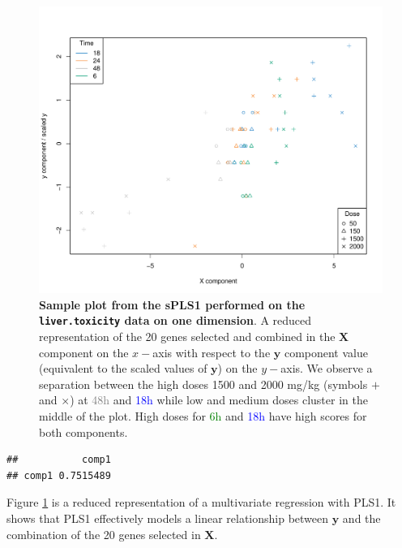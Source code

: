 \documentclass[
]{book}
\newenvironment{Shaded}{\begin{snugshade}}{\end{snugshade}}
\newcommand{\FunctionTok}[1]{\textcolor[rgb]{0.00,0.00,0.00}{#1}}
\newcommand{\NormalTok}[1]{#1}
\newcommand{\SpecialCharTok}[1]{\textcolor[rgb]{0.00,0.00,0.00}{#1}}
\begin{document}
\begin{figure}

{\centering \includegraphics[width=0.7\linewidth]{Figures/PLS/04-spls1-sample-plot2-1} 

}

\caption{\textbf{Sample plot from the sPLS1 performed on the \texttt{liver.toxicity} data on one dimension}. A reduced representation of the 20 genes selected and combined in the \(\boldsymbol X\) component on the \(x-\)axis with respect to the \(\boldsymbol y\) component value (equivalent to the scaled values of \(\boldsymbol y\)) on the \(y-\)axis. We observe a separation between the high doses 1500 and 2000 mg/kg (symbols \(+\) and \(\times\)) at \textcolor{grey}{48h} and \textcolor{blue}{18h} while low and medium doses cluster in the middle of the plot. High doses for \textcolor{green}{6h} and \textcolor{blue}{18h} have high scores for both components.}\label{fig:04-spls1-sample-plot2}
\end{figure}

\begin{Shaded}
\end{Shaded}

\begin{verbatim}
##           comp1
## comp1 0.7515489
\end{verbatim}



Figure \ref{fig:04-spls1-sample-plot2} is a reduced representation of a multivariate regression with PLS1. It shows that PLS1 effectively models a linear relationship between \(\boldsymbol y\) and the combination of the 20 genes selected in \(\boldsymbol X\).
\end{document}
